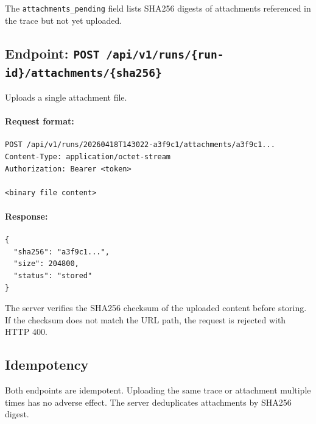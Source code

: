 The \texttt{attachments\_pending} field lists SHA256 digests of attachments referenced in the trace but not yet uploaded.

\subsection{Endpoint: \texttt{POST /api/v1/runs/\{run-id\}/attachments/\{sha256\}}}

Uploads a single attachment file.

\paragraph{Request format:}

\begin{verbatim}
POST /api/v1/runs/20260418T143022-a3f9c1/attachments/a3f9c1...
Content-Type: application/octet-stream
Authorization: Bearer <token>

<binary file content>
\end{verbatim}

\paragraph{Response:}

\begin{verbatim}
{
  "sha256": "a3f9c1...",
  "size": 204800,
  "status": "stored"
}
\end{verbatim}

The server verifies the SHA256 checksum of the uploaded content before storing. If the checksum does not match the URL path, the request is rejected with HTTP 400.

\subsection{Idempotency}

Both endpoints are idempotent. Uploading the same trace or attachment multiple times has no adverse effect. The server deduplicates attachments by SHA256 digest.
